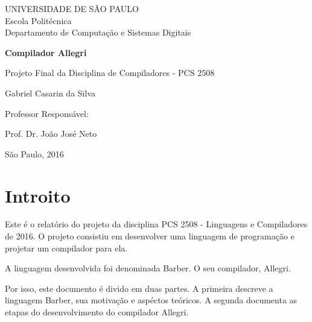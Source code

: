 \documentclass[a4paper,12pt]{report}
\begin{document}
    \begin{titlepage}
        \begin{center}

            UNIVERSIDADE DE SÃO PAULO\\
            Escola Politécnica\\
            Departamento de Computação e Sistemas Digitais
            \vspace{8cm}
            
            \Huge
            \textbf{Compilador Allegri}
            
            \vspace{0.5cm}
            \large
            Projeto Final da Disciplina de Compiladores - PCS 2508
            
            \vspace{2.5cm}
            \Large
            Gabriel Casarin da Silva
            
        \end{center}
        
        \vspace{3.0cm}
        \setlength{\parindent}{10.5cm}
        \large Professor Responsável:

        \setlength{\parindent}{10.5cm}
        Prof. Dr. João José Neto
        

        \begin{center}
            \vfill
            \large
            São Paulo, 2016
        \end{center}
            
    \end{titlepage}
        

    \tableofcontents
    \newpage
    \chapter*{Introito}
    Este é o relatório do projeto da disciplina PCS 2508 - Linguagens e Compiladores de 2016.
    O projeto consistiu em desenvolver uma linguagem de programação e projetar um compilador para ela.

    A linguagem desenvolvida foi denominada Barber. O seu compilador, Allegri.

    Por isso, este documento é divido em duas partes. A primeira descreve a linguagem Barber, sua motivação e aspéctos teóricos. A segunda documenta as etapas do desenvolvimento do compilador Allegri.
\end{document}
